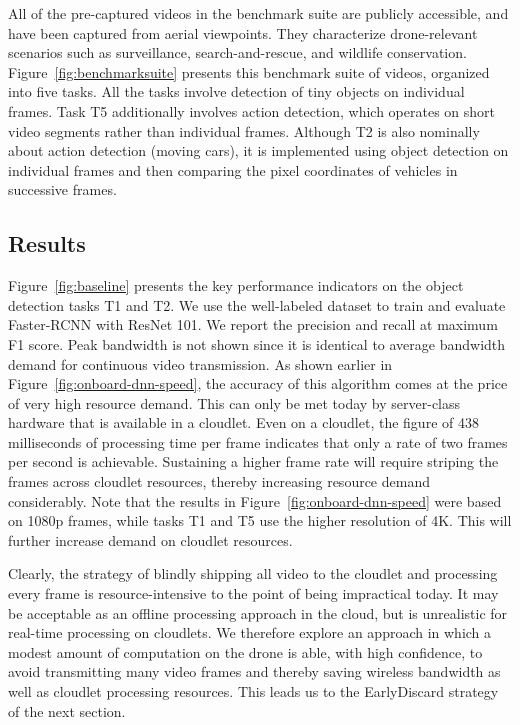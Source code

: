 All of the pre-captured videos in the benchmark suite are publicly accessible,
and have been captured from aerial viewpoints. They characterize drone-relevant
scenarios such as surveillance, search-and-rescue, and wildlife conservation.
Figure~\ref{fig:benchmarksuite} presents this benchmark suite of videos,
organized into five tasks. All the tasks involve detection of tiny objects on
individual frames. Task T5 additionally involves action detection, which
operates on short video segments rather than individual frames. Although T2 is
also nominally about action detection (moving cars), it is implemented using
object detection on individual frames and then comparing the pixel coordinates
of vehicles in successive frames.


\subsection{Results}
\label{sec:dumbdrone-results}

Figure~\ref{fig:baseline} presents the key performance indicators on the object
detection tasks T1 and T2. We use the well-labeled dataset to train and
evaluate Faster-RCNN with ResNet 101. We report the precision and recall at
maximum F1 score.  Peak bandwidth is not shown since it is identical to average
bandwidth demand for continuous video transmission.  As shown earlier in
Figure~\ref{fig:onboard-dnn-speed}, the accuracy of this algorithm comes at
the price of very high resource demand.  This can only be met today by
server-class hardware that is available in a cloudlet.  Even on a cloudlet, the
figure of 438 milliseconds of processing time per frame indicates that only a
rate of two frames per second is achievable.  Sustaining a higher frame rate
will require striping the frames across cloudlet resources, thereby increasing
resource demand considerably.  Note that the results in
Figure~\ref{fig:onboard-dnn-speed} were based on 1080p frames, while tasks T1
and T5 use the higher resolution of 4K. This will further increase demand on
cloudlet resources.

Clearly, the strategy of blindly shipping all video to the cloudlet
and processing every frame is resource-intensive to the point of being
impractical today.  It may be acceptable as an offline processing
approach in the cloud, but is unrealistic for real-time processing on
cloudlets.  We therefore explore an approach in which a modest amount
of computation on the drone is able, with high confidence, to avoid
transmitting many video frames and thereby saving wireless bandwidth
as well as cloudlet processing resources.  This leads us to the {\xc
  EarlyDiscard} strategy of the next section.



